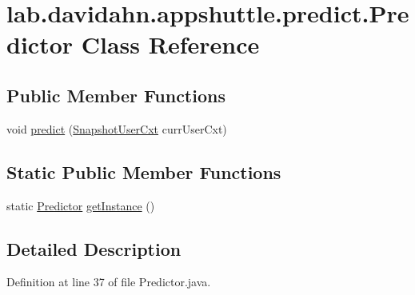 \hypertarget{classlab_1_1davidahn_1_1appshuttle_1_1predict_1_1_predictor}{\section{lab.\-davidahn.\-appshuttle.\-predict.\-Predictor \-Class \-Reference}
\label{classlab_1_1davidahn_1_1appshuttle_1_1predict_1_1_predictor}
}
\subsection*{\-Public \-Member \-Functions}
\begin{DoxyCompactItemize}
\item 
void \hyperlink{classlab_1_1davidahn_1_1appshuttle_1_1predict_1_1_predictor_ab1f6a7adf6eba5ef60b56c2add8d68bf}{predict} (\hyperlink{classlab_1_1davidahn_1_1appshuttle_1_1collect_1_1_snapshot_user_cxt}{\-Snapshot\-User\-Cxt} curr\-User\-Cxt)
\end{DoxyCompactItemize}
\subsection*{\-Static \-Public \-Member \-Functions}
\begin{DoxyCompactItemize}
\item 
static \hyperlink{classlab_1_1davidahn_1_1appshuttle_1_1predict_1_1_predictor}{\-Predictor} \hyperlink{classlab_1_1davidahn_1_1appshuttle_1_1predict_1_1_predictor_afff8832a42d9857c3859e2a0ba9488dd}{get\-Instance} ()
\end{DoxyCompactItemize}


\subsection{\-Detailed \-Description}


\-Definition at line 37 of file \-Predictor.\-java.



